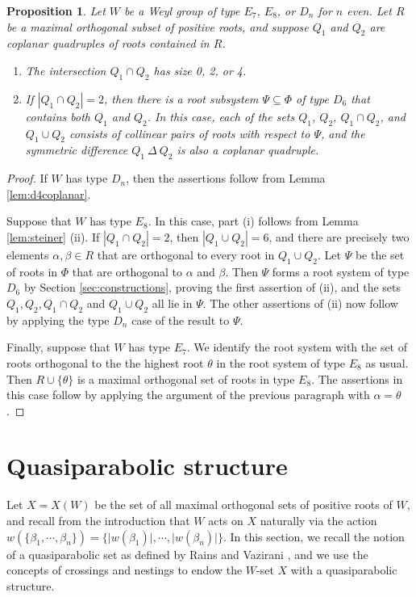 \documentclass[11pt]{amsart}
\theoremstyle{plain}
\newtheorem{prop}[theorem]{Proposition}
\theoremstyle{definition}
\theoremstyle{remark}
\numberwithin{equation}{subsection}
\newcommand{\al}{\alpha}
\newcommand{\be}{\beta}
\newcommand{\coplanar}{coplanar\xspace}
\newcommand{\allroots}{\Phi}
\newcommand{\abs}[1]{\lvert #1 \rvert}
\begin{document}
\begin{prop}\label{prop:overlap}
    Let $W$ be a Weyl group of type $E_7$, $E_8$, or $D_n$ for $n$ even. Let
    $R$ be a maximal orthogonal subset of positive roots, and suppose $Q_1$ and $Q_2$
    are \coplanar quadruples of roots contained in $R$. 
    \begin{enumerate}
        \item[{\rm (i)}]{The intersection $Q_1 \cap Q_2$ has size 0, 2, or 4.}
        \item[{\rm (ii)}]{If $|Q_1 \cap Q_2| = 2$, then there is a root
     subsystem $\Psi \subseteq \allroots$ of type $D_6$ that contains both $Q_1$
     and $Q_2$. In this case, each of the sets $Q_1$, $Q_2$, $Q_1 \cap Q_2$, and
     $Q_1 \cup Q_2$ consists of collinear pairs of roots with respect to $\Psi$,
     and the symmetric difference $Q_1 \ \Delta\ Q_2$ is also a \coplanar
 quadruple.}
\end{enumerate}
\end{prop}

\begin{proof}
If $W$ has type $D_n$, then the assertions follow from Lemma
\ref{lem:d4coplanar}.

Suppose that $W$ has type $E_8$. In this case, part (i) follows from Lemma
\ref{lem:steiner} (ii).  If $|Q_1 \cap Q_2| = 2$, then $|Q_1 \cup Q_2| = 6$, and
there are precisely two elements $\al, \be \in R$ that are orthogonal to every
root in $Q_1 \cup Q_2$. Let $\Psi$ be the set of roots in $\Phi$ that are
orthogonal to $\al$ and $\be$. Then $\Psi$ forms a root system of type $D_6$ by
Section \ref{sec:constructions}, proving the first assertion of (ii), and the
sets $Q_1, Q_2, Q_1\cap Q_2$ and $Q_1\cup Q_2$ all lie in $\Psi$.  The other
assertions of (ii) now follow by applying the type $D_n$ case of the result to
$\Psi$.

Finally, suppose that $W$ has type $E_7$. We identify the root system with the
set of roots orthogonal to the  the highest root $\theta$ in the root system of
type $E_8$ as usual.  Then $R \cup \{\theta\}$ is a maximal orthogonal set of
roots in type $E_8$. The assertions in this case follow by applying the argument
of the previous paragraph with $\al = \theta$.
\end{proof}




\section{Quasiparabolic structure}\label{sec:quasi}
Let $X=X(W)$ be the set of all maximal orthogonal sets of positive roots of $W$,
and recall from the introduction that $W$ acts on $X$ naturally via the action
$w(\{\be_1,\cdots,\be_n\})=\{\abs{w(\be_1)}, \cdots, \abs{w(\be_n)}\}$.  In
this section, we recall the notion of a quasiparabolic set as defined
by Rains and Vazirani \cite{rains13}, and we use the concepts of crossings and
nestings to endow the $W$-set $X$ with a quasiparabolic structure.
\end{document}
